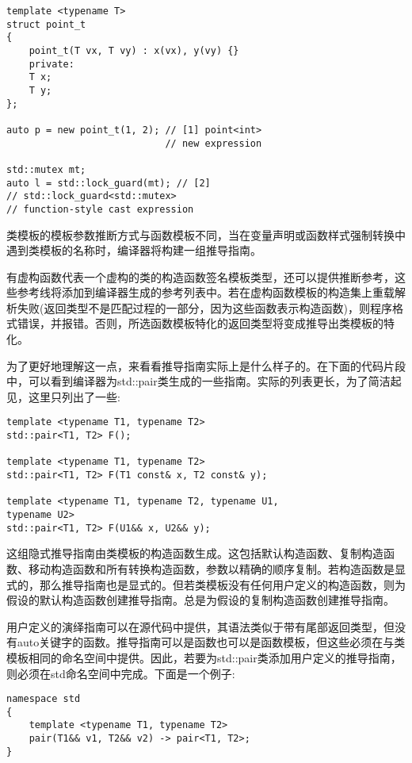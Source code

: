 \begin{lstlisting}[style=styleCXX]
template <typename T>
struct point_t
{
	point_t(T vx, T vy) : x(vx), y(vy) {}
	private:
	T x;
	T y;
};

auto p = new point_t(1, 2); // [1] point<int>
							// new expression
							
std::mutex mt;
auto l = std::lock_guard(mt); // [2]
// std::lock_guard<std::mutex>
// function-style cast expression
\end{lstlisting}

类模板的模板参数推断方式与函数模板不同，当在变量声明或函数样式强制转换中遇到类模板的名称时，编译器将构建一组推导指南。

有虚构函数代表一个虚构的类的构造函数签名模板类型，还可以提供推断参考，这些参考线将添加到编译器生成的参考列表中。若在虚构函数模板的构造集上重载解析失败(返回类型不是匹配过程的一部分，因为这些函数表示构造函数)，则程序格式错误，并报错。否则，所选函数模板特化的返回类型将变成推导出类模板的特化。

为了更好地理解这一点，来看看推导指南实际上是什么样子的。在下面的代码片段中，可以看到编译器为std::pair类生成的一些指南。实际的列表更长，为了简洁起见，这里只列出了一些:

\begin{lstlisting}[style=styleCXX]
template <typename T1, typename T2>
std::pair<T1, T2> F();

template <typename T1, typename T2>
std::pair<T1, T2> F(T1 const& x, T2 const& y);

template <typename T1, typename T2, typename U1,
typename U2>
std::pair<T1, T2> F(U1&& x, U2&& y);
\end{lstlisting}

这组隐式推导指南由类模板的构造函数生成。这包括默认构造函数、复制构造函数、移动构造函数和所有转换构造函数，参数以精确的顺序复制。若构造函数是显式的，那么推导指南也是显式的。但若类模板没有任何用户定义的构造函数，则为假设的默认构造函数创建推导指南。总是为假设的复制构造函数创建推导指南。

用户定义的演绎指南可以在源代码中提供，其语法类似于带有尾部返回类型，但没有auto关键字的函数。推导指南可以是函数也可以是函数模板，但这些必须在与类模板相同的命名空间中提供。因此，若要为std::pair类添加用户定义的推导指南，则必须在std命名空间中完成。下面是一个例子:

\begin{lstlisting}[style=styleCXX]
namespace std
{
	template <typename T1, typename T2>
	pair(T1&& v1, T2&& v2) -> pair<T1, T2>;
}
\end{lstlisting}


